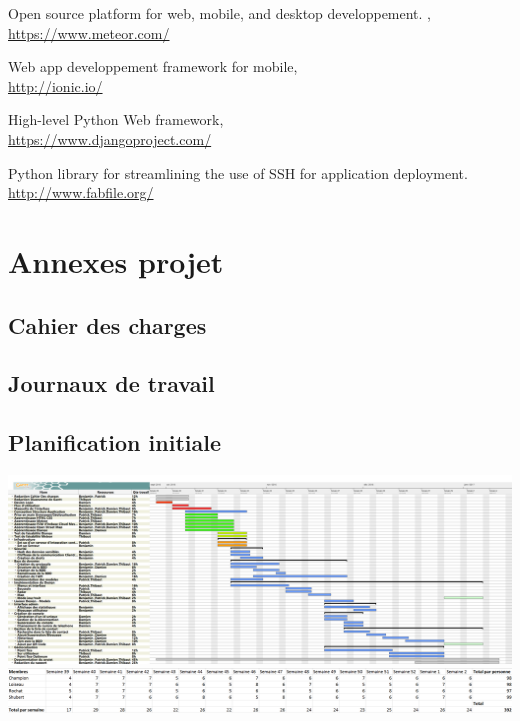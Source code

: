 \documentclass[french]{article}
\begin{document}
		\newpage
	
	\newpage
	

			
	
	\listoffigures
			
	\begin{thebibliography}{9}
		Open source platform for web, mobile, and desktop developpement. ,\\ \url{https://www.meteor.com/}
		
		Web app developpement framework for mobile,\\ \url{http://ionic.io/}
		
		High-level Python Web framework, \\ \url{https://www.djangoproject.com/}
		
		Python library for streamlining the use of SSH for application deployment.\\ \url{http://www.fabfile.org/}
	\end{thebibliography}
			
	\newpage
		
		
	\section{Annexes projet}
		\subsection{Cahier des charges}
			
		\subsection{Journaux de travail}
			
		\subsection{Planification initiale}
			
			
			\centering
			\includegraphics[angle=90,width=\linewidth,height=\textheight]{../diagramme-de-gantt/diagramme-de-gantt.png}
			\centering
			\includegraphics[angle=90,height=\textheight]{../diagramme-de-gantt/tableau-heures-personnes}
				
\end{document}
